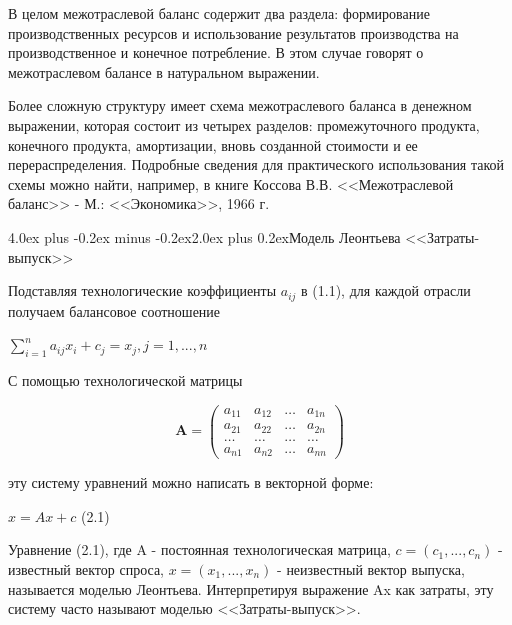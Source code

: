 \documentclass[12pt, 4paper]{book}
\makeatletter
\renewcommand{\section}{\@startsection{section}{1}{1pt}%
	{4.0ex plus -0.2ex minus -0.2ex}{2.0ex plus 0.2ex}{\centering\bf}}%
\makeatother
\begin{document}
{В целом межотраслевой баланс содержит два раздела: формирование производственных ресурсов и использование результатов производства на производственное и конечное потребление. В этом случае говорят о межотраслевом балансе в натуральном выражении.
\par

Более сложную структуру имеет схема межотраслевого баланса в денежном выражении, которая состоит из четырех разделов: промежуточного продукта, конечного продукта, амортизации, вновь созданной стоимости и ее перераспределения. Подробные сведения для практического использования такой схемы можно найти, например, в книге Коссова В.В. <<Межотраслевой баланс>> - М.: <<Экономика>>, 1966 г.
\newpage
\begin{center}
\section{Модель Леонтьева <<Затраты-выпуск>>}
\end{center}
\par

Подставляя технологические коэффициенты $a_{ij}$ в (1.1), для каждой отрасли получаем балансовое соотношение
\begin{center}
$\sum\limits_{i=1}^{n}a_{ij}x_i + c_j =x_j, j=1,...,n$
\end{center}
\par

С помощью технологической матрицы
\begin{center}
\begin{displaymath}
\mathbf{A} =
\left( \begin{array}{cccc}
a_{11} & a_{12} & \ldots & a_{1n} \\
a_{21} & a_{22} & \ldots & a_{2n} \\
\ldots & \ldots & \ldots & \ldots \\
a_{n1} & a_{n2} & \ldots & a_{nn} 
\end{array} \right)
\end{displaymath}
\end{center}
\par

эту систему уравнений можно написать в векторной форме:
\begin{center}
$x = Ax + c$ (2.1)
\end{center}
\par

Уравнение (2.1), где A - постоянная технологическая матрица, $c= (c_1,...,c_n)$ - известный вектор спроса, $x=(x_1,...,x_n)$ - неизвестный вектор выпуска, называется моделью Леонтьева. Интерпретируя выражение Ax как затраты, эту систему часто называют моделью <<Затраты-выпуск>>.
\par

}
\end{document}
